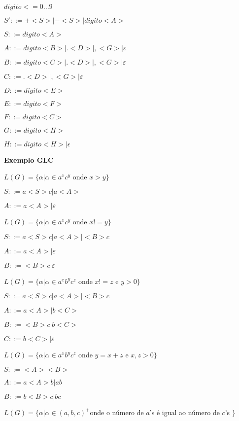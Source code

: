 \documentclass[ ]{article}
\begin{document}
	$digito<= 0 ... 9$
	
	$S'::= +<S> | -<S> | digito<A>$
	
	$S::= digito<A>$
	
	$A::= digito<B> | .<D>| ,<G>| \varepsilon$ %
	
	$B::= digito<C> | .<D> | ,<G> | \varepsilon$ %
	
	$C::=.<D> | ,<G> | \varepsilon$ %
	
		$D::= digito<E>$
	
		$E::= digito<F>$
	
		$F::=digito<C>$ %
	
	$G::= digito<H>$
	
	$H::= digito<H> | \epsilon$
	
	\textbf{Exemplo GLC}
	
	$L(G) =\{ \alpha | \alpha \in a^x c^y$ onde $x>y\}$
	
	$S::= a<S>c | a<A>$
	
	$A::= a<A> | \varepsilon$
	
	$L(G) =\{ \alpha | \alpha \in a^x c^y$ onde $x!=y\}$
	
	$S::= a<S>c | a<A> | <B>c$
	
	$A::= a<A> | \varepsilon$
	
	$B::= <B>c | \varepsilon$
	
	$L(G) =\{ \alpha | \alpha \in a^x b^y c^z$ onde $x!=z$ e $y>0\}$
	
	$S::= a<S>c| a<A> | <B>c$
	
	$A::= a<A> | b<C>$ %
	
	$B::= <B>c | b<C>$
	
	$C::= b<C> | \varepsilon$
	
	$L(G) =\{ \alpha | \alpha \in a^x b^y c^z$ onde $y=x+z$ e $x,z>0\}$
	
	$S::= <A><B>$
	
	$A::= a<A>b|ab$
	
	$B::=b<B>c|bc$
	
	
	$L(G) =\{ \alpha | \alpha \in (a,b,c)^+$onde o número de $a$'s é igual ao número de $c$'s $\}$ 
	
\end{document}
